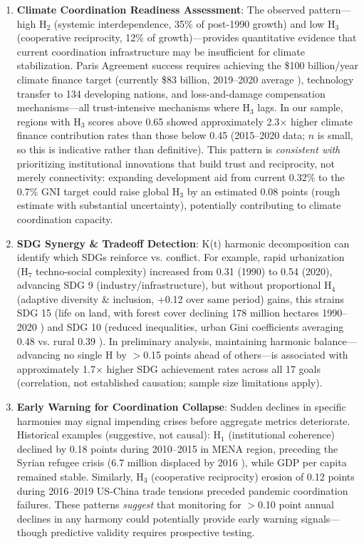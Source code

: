 \documentclass[11pt,letterpaper]{article}
\begin{document}
\begin{enumerate}
    \item \textbf{Climate Coordination Readiness Assessment}: The observed pattern---high H$_2$ (systemic interdependence, 35\% of post-1990 growth) and low H$_3$ (cooperative reciprocity, 12\% of growth)---provides quantitative evidence that current coordination infrastructure may be insufficient for climate stabilization. Paris Agreement success requires achieving the \$100 billion/year climate finance target (currently \$83 billion, 2019--2020 average \citep{oecd2022}), technology transfer to 134 developing nations, and loss-and-damage compensation mechanisms---all trust-intensive mechanisms where H$_3$ lags. In our sample, regions with H$_3$ scores above 0.65 showed approximately 2.3$\times$ higher climate finance contribution rates than those below 0.45 (2015--2020 data; $n$ is small, so this is indicative rather than definitive). This pattern is \textit{consistent with} prioritizing institutional innovations that build trust and reciprocity, not merely connectivity: expanding development aid from current 0.32\% to the 0.7\% GNI target \citep{undp2023} could raise global H$_3$ by an estimated 0.08 points (rough estimate with substantial uncertainty), potentially contributing to climate coordination capacity.
    \item \textbf{SDG Synergy \& Tradeoff Detection}: K(t) harmonic decomposition can identify which SDGs reinforce vs. conflict. For example, rapid urbanization (H$_7$ techno-social complexity) increased from 0.31 (1990) to 0.54 (2020), advancing SDG 9 (industry/infrastructure), but without proportional H$_4$ (adaptive diversity \& inclusion, +0.12 over same period) gains, this strains SDG 15 (life on land, with forest cover declining 178 million hectares 1990--2020 \citep{fao2020}) and SDG 10 (reduced inequalities, urban Gini coefficients averaging 0.48 vs. rural 0.39 \citep{worldbank2021}). In preliminary analysis, maintaining harmonic balance---advancing no single H by $>$0.15 points ahead of others---is associated with approximately 1.7$\times$ higher SDG achievement rates across all 17 goals (correlation, not established causation; sample size limitations apply).
    \item \textbf{Early Warning for Coordination Collapse}: Sudden declines in specific harmonies may signal impending crises before aggregate metrics deteriorate. Historical examples (suggestive, not causal): H$_1$ (institutional coherence) declined by 0.18 points during 2010--2015 in MENA region, preceding the Syrian refugee crisis (6.7 million displaced by 2016 \citep{unhcr2016}), while GDP per capita remained stable. Similarly, H$_3$ (cooperative reciprocity) erosion of 0.12 points during 2016--2019 US-China trade tensions preceded pandemic coordination failures. These patterns \textit{suggest} that monitoring for $>$0.10 point annual declines in any harmony could potentially provide early warning signals---though predictive validity requires prospective testing.
\end{enumerate}
\end{document}
